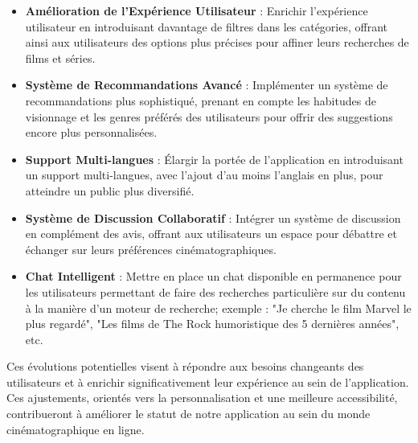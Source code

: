 \documentclass[a4paper]{article}
\begin{document}
\begin{itemize}
    \item \textbf{Amélioration de l'Expérience Utilisateur} : Enrichir l'expérience utilisateur en introduisant davantage de filtres dans les catégories, offrant ainsi aux utilisateurs des options plus précises pour affiner leurs recherches de films et séries.

    \item \textbf{Système de Recommandations Avancé} : Implémenter un système de recommandations plus sophistiqué, prenant en compte les habitudes de visionnage et les genres préférés des utilisateurs pour offrir des suggestions encore plus personnalisées.

    \item \textbf{Support Multi-langues} : Élargir la portée de l'application en introduisant un support multi-langues, avec l'ajout d'au moins l'anglais en plus, pour atteindre un public plus diversifié.

    \item \textbf{Système de Discussion Collaboratif} : Intégrer un système de discussion en complément des avis, offrant aux utilisateurs un espace pour débattre et échanger sur leurs préférences cinématographiques.

    \item \textbf{Chat Intelligent} : Mettre en place un chat disponible en permanence pour les utilisateurs permettant de faire des recherches particulière sur du contenu à la manière d'un moteur de recherche; exemple : "Je cherche le film Marvel le plus regardé", "Les films de The Rock humoristique des 5 dernières années", etc.
    
\end{itemize} 

Ces évolutions potentielles visent à répondre aux besoins changeants des utilisateurs et à enrichir significativement leur expérience au sein de l'application. Ces ajustements, orientés vers la personnalisation et une meilleure accessibilité, contribueront à améliorer le statut de notre application au sein du monde cinématographique en ligne.
\end{document}

